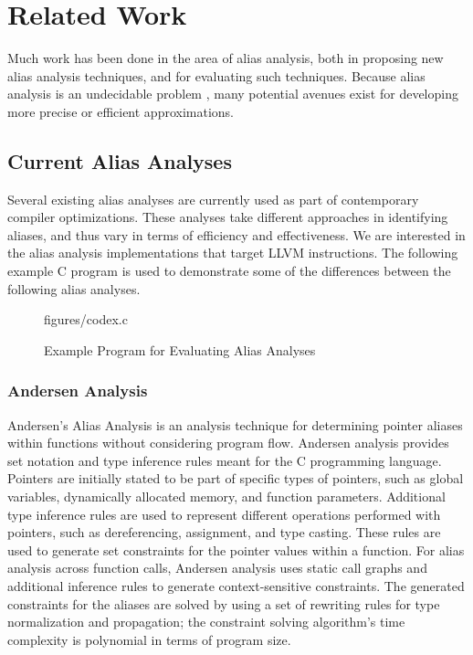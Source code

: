 \chapter{Related Work}

Much work has been done in the area of alias analysis, both in proposing new alias analysis techniques, and for evaluating such techniques. Because alias analysis is an undecidable problem \cite{undecidable}, many potential avenues exist for developing more precise or efficient approximations.

\section{Current Alias Analyses}
Several existing alias analyses are currently used as part of contemporary compiler optimizations. These analyses take different approaches in identifying aliases, and thus vary in terms of efficiency and effectiveness. We are interested in the alias analysis implementations that target LLVM instructions. The following example C program is used to demonstrate some of the differences between the following alias analyses.

\begin{figure} [h]
    {figures/codex.c}
   \caption{Example Program for Evaluating Alias Analyses}
   \label{fig:codex}
\end{figure}

\subsection{Andersen Analysis}
Andersen's Alias Analysis \cite{Andersen} is an analysis technique for determining pointer aliases within functions without considering program flow. Andersen analysis provides set notation and type inference rules meant for the C programming language. Pointers are initially stated to be part of specific types of pointers, such as global variables, dynamically allocated memory, and function parameters. Additional type inference rules are used to represent different operations performed with pointers, such as dereferencing, assignment, and type casting. These rules are used to generate set constraints for the pointer values within a function. For alias analysis across function calls, Andersen analysis uses static call graphs and additional inference rules to generate context-sensitive constraints. The generated constraints for the aliases are solved by using a set of rewriting rules for type normalization and propagation; the constraint solving algorithm's time complexity is polynomial in terms of program size.

